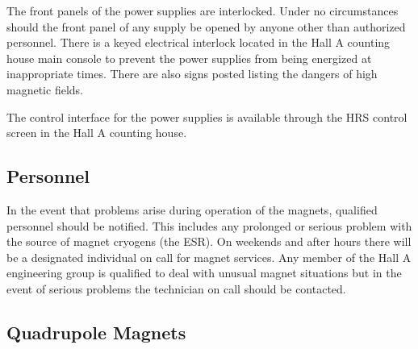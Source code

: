 \begin{safetyen}{10}{15}

The front panels of the power supplies are interlocked.  Under no 
circumstances should the front panel of any supply be opened by anyone 
other than authorized personnel.  There is a keyed electrical interlock 
located in the Hall A counting house main console to prevent the power 
supplies from being energized at inappropriate times.  There are also 
signs posted listing the dangers of high magnetic fields.
\end{safetyen}

The control interface for the power supplies is available through the 
HRS control screen in the Hall A counting house.

\begin{safetyen}{10}{15}
\subsection{Personnel}
\end{safetyen}

In the event that problems arise during 
operation of the magnets, qualified personnel should be notified.  This 
includes any prolonged or serious problem with the source of magnet 
cryogens (the ESR).  On weekends and after hours there will be a 
designated individual on call for magnet services.  Any member of the 
Hall A engineering group is qualified to deal with unusual magnet 
situations but in the event of serious problems the technician on
call should be contacted.

\subsection{Quadrupole Magnets}


